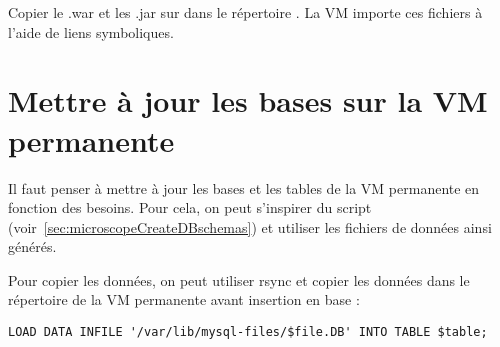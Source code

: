 Copier le .war et les .jar sur  dans le répertoire .
La VM  importe ces fichiers à l'aide de liens symboliques.

\section{Mettre à jour les bases sur la VM permanente} \label{sec:maj_vm_permanente}

Il faut penser à mettre à jour les bases et les tables de la VM permanente en fonction des besoins.
Pour cela, on peut s'inspirer du script  (voir~\autoref{sec:microscopeCreateDBschemas})
et utiliser les fichiers de données ainsi générés.

Pour copier les données, on peut utiliser rsync et copier les données dans le répertoire  de la VM permanente avant insertion en base :
\begin{lstlisting}[style=SQL]
LOAD DATA INFILE '/var/lib/mysql-files/$file.DB' INTO TABLE $table;
\end{lstlisting}
